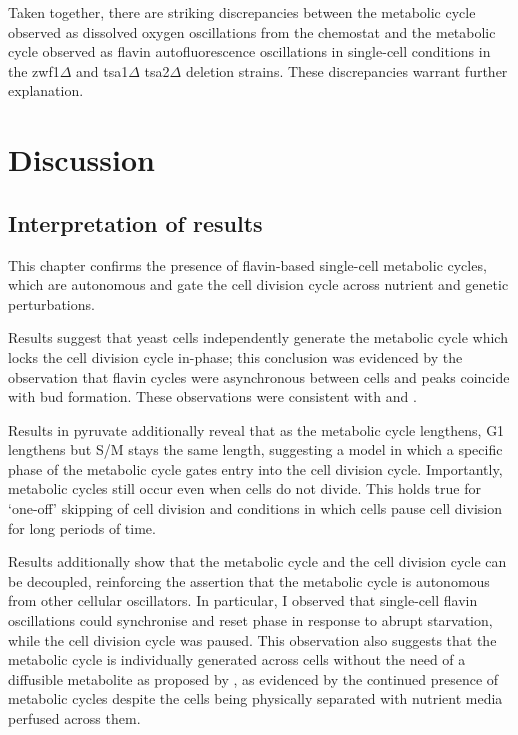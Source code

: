 Taken together, there are striking discrepancies between the metabolic cycle observed as dissolved oxygen oscillations from the chemostat and the metabolic cycle observed as flavin autofluorescence oscillations in single-cell conditions in the zwf1$\Delta$ and tsa1$\Delta$ tsa2$\Delta$ deletion strains.
These discrepancies warrant further explanation.


\section{Discussion}
\label{sec:biology-discussion}

\subsection{Interpretation of results}
\label{subsec:biology-discussion-interpretation}

This chapter confirms the presence of flavin-based single-cell metabolic cycles, which are autonomous and gate the cell division cycle across nutrient and genetic perturbations.

Results suggest that yeast cells independently generate the metabolic cycle which locks the cell division cycle in-phase;
this conclusion was evidenced by the observation that flavin cycles were asynchronous between cells and peaks coincide with bud formation.
These observations were consistent with \textcite{papagiannakisAutonomousMetabolicOscillations2017} and \textcite{baumgartnerFlavinbasedMetabolicCycles2018}.

Results in pyruvate additionally reveal that as the metabolic cycle lengthens, G1 lengthens but S/M stays the same length, suggesting a model in which a specific phase of the metabolic cycle gates entry into the cell division cycle.
Importantly, metabolic cycles still occur even when cells do not divide.
This holds true for `one-off' skipping of cell division and conditions in which cells pause cell division for long periods of time.

Results additionally show that the metabolic cycle and the cell division cycle can be decoupled, reinforcing the assertion that the metabolic cycle is autonomous from other cellular oscillators.
In particular, I observed that single-cell flavin oscillations could synchronise and reset phase in response to abrupt starvation, while the cell division cycle was paused.
This observation also suggests that the metabolic cycle is individually generated across cells without the need of a diffusible metabolite as proposed by \textcite{krishnaMinimalPushPull2018}, as evidenced by the continued presence of metabolic cycles despite the cells being physically separated with nutrient media perfused across them.


